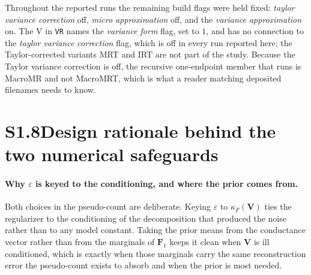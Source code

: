 \documentclass[11pt]{article}
\begin{document}
Throughout the reported runs the remaining build flags were held fixed: \emph{taylor variance
correction} off, \emph{micro approximation} off, and the \emph{variance approximation} on. The V in
\texttt{VR} names the \emph{variance form} flag, set to $1$, and has no connection to the
\emph{taylor variance correction} flag, which is off in every run reported here; the
Taylor-corrected variants MRT and IRT are not part of the study. Because the Taylor variance
correction is off, the recursive one-endpoint member that runs is MacroMR and not MacroMRT, which is
what a reader matching deposited filenames needs to know.


\section*{S1.8\quad Design rationale behind the two numerical safeguards}


\paragraph{Why $\varepsilon$ is keyed to the conditioning, and where the prior comes from.} Both
choices in the pseudo-count are deliberate. Keying $\varepsilon$ to $\kappa_F(\mathbf{V})$ ties the
regularizer to the conditioning of the decomposition that produced the noise rather than to any
model constant. Taking the prior means from the conductance vector rather than from the marginals of
$\mathbf{F}_1$ keeps it clean when $\mathbf{V}$ is ill conditioned, which is exactly when those
marginals carry the same reconstruction error the pseudo-count exists to absorb and when the prior
is most needed.
\end{document}

